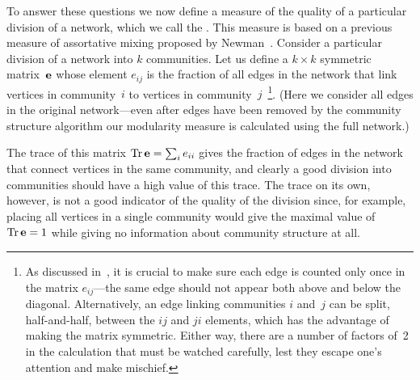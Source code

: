 \documentclass[twocolumn,pre,superscriptaddress]{revtex4}
\begin{document}
To answer these questions we now define a measure of the quality of a
particular division of a network, which we call the .
This measure is based on a previous measure of assortative mixing proposed
by Newman~\cite{Newman03c}.  Consider a particular division of a network
into $k$ communities.  Let us define a $k\times k$ symmetric matrix~$\mathbf{e}$
whose element $e_{ij}$ is the fraction of all edges in the network that
link vertices in community~$i$ to vertices in community~$j$~\footnote{As
discussed in~\cite{Newman03c}, it is crucial to make sure each edge is
counted only once in the matrix $e_{ij}$---the same edge should not appear
both above and below the diagonal.  Alternatively, an edge linking
communities $i$ and~$j$ can be split, half-and-half, between the $ij$ and
$ji$ elements, which has the advantage of making the matrix symmetric.
Either way, there are a number of factors of~2 in the calculation that must
be watched carefully, lest they escape one's attention and make mischief.}.
(Here we consider all edges in the original network---even after edges have
been removed by the community structure algorithm our modularity measure is
calculated using the full network.)

The trace of this matrix $\mathop{\rm Tr}\mathbf{e}=\sum_i e_{ii}$ gives the fraction of edges
in the network that connect vertices in the same community, and clearly a
good division into communities should have a high value of this trace.  The
trace on its own, however, is not a good indicator of the quality of the
division since, for example, placing all vertices in a single community
would give the maximal value of $\mathop{\rm Tr}\mathbf{e}=1$ while giving no information
about community structure at all.
\end{document}
